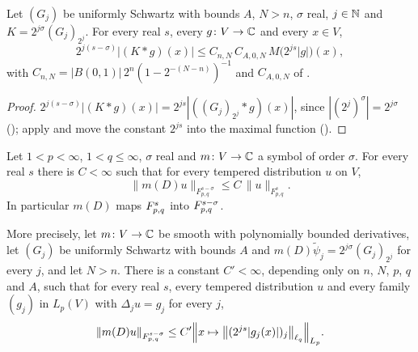 \begin{lemma}
\label{lem:symbol-kernel-maximal}
\leanok
{}
Let $(G_j)$ be uniformly Schwartz with bounds $A$, $N > n$, $\sigma$ real, $j \in \mathbb{N}$ and
$K = 2^{j\sigma} (G_j)_{2^j}$. For every real $s$, every $g \colon V \to \mathbb{C}$ and every $x \in V$,
\[
  2^{j(s - \sigma)} |(K * g)(x)| \leq C_{n,N} \, C_{A,0,N} \, M\bigl(2^{js} |g|\bigr)(x) ,
\]
with $C_{n,N} = |B(0, 1)| \, 2^n (1 - 2^{-(N - n)})^{-1}$ and $C_{A,0,N}$ of
.
\end{lemma}

\begin{proof}
\leanok
$2^{j(s - \sigma)} |(K * g)(x)| = 2^{js} |((G_j)_{2^j} * g)(x)|$, since
$|(2^j)^\sigma| = 2^{j\sigma}$ (); apply
 and move the constant $2^{js}$ into the maximal function
().
\end{proof}

\begin{theorem}
\label{thm:tl-multiplier}
\leanok
{}
Let $1 < p < \infty$, $1 < q \leq \infty$, $\sigma$ real and $m \colon V \to \mathbb{C}$ a symbol of order
$\sigma$. For every real $s$ there is $C < \infty$ such that for every tempered distribution $u$
on $V$,
\[
  \|m(D) u\|_{F^{s-\sigma}_{p,q}} \leq C \, \|u\|_{F^s_{p,q}} .
\]
In particular $m(D)$ maps $F^{s}_{p,q}$ into $F^{s-\sigma}_{p,q}$.

More precisely, let $m \colon V \to \mathbb{C}$ be smooth with polynomially bounded derivatives, let
$(G_j)$ be uniformly Schwartz with bounds $A$ and $m(D) \tilde\psi_j = 2^{j\sigma} (G_j)_{2^j}$
for every $j$, and let $N > n$. There is a constant $C' < \infty$, depending only on $n$, $N$,
$p$, $q$ and $A$, such that for every real $s$, every tempered distribution $u$ and every family
$(g_j)$ in $L_p(V)$ with $\Delta_j u = g_j$ for every $j$,
\[
  \|m(D) u\|_{F^{s-\sigma}_{p,q}} \leq C'
  \Bigl\| x \mapsto \bigl\| (2^{js} |g_j(x)|)_j \bigr\|_{\ell_q} \Bigr\|_{L_p} .
\]
\end{theorem}

